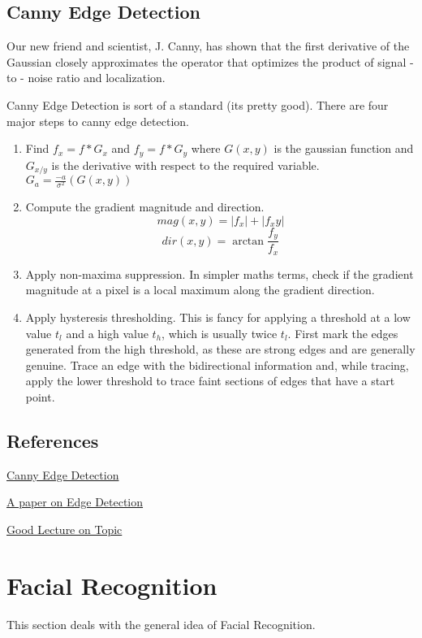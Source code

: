 \subsection{Canny Edge Detection}
Our new friend and scientist, J. Canny, has shown that the first derivative of the Gaussian closely approximates the operator that optimizes the product of signal - to - noise ratio and localization.

Canny Edge Detection is sort of a standard (its pretty good). There are four major steps to canny edge detection.
\begin{enumerate}
	\item Find $f_x = f * G_x$ and $f_y = f * G_y$ where $G(x,y)$ is the gaussian function and $G_{x/y}$ is the derivative with respect to the required variable. $G_a = \frac{-a}{\sigma^2}(G(x,y))$
	\item Compute the gradient magnitude and direction.\[ mag(x,y) = \left| f_x \right| + \left| f_xy \right| \] \[dir(x,y) = \arctan{\frac{f_y}{f_x}}\]
	\item Apply non-maxima suppression. In simpler maths terms, check if the gradient magnitude at a pixel is a local maximum along the gradient direction.
	\item Apply hysteresis thresholding. This is fancy for applying a threshold at a low value $t_l$ and a high value $t_h$, which is usually twice $t_l$. First mark the edges generated from the high threshold, as these are strong edges and are generally genuine. Trace an edge with the bidirectional information and, while tracing, apply the lower threshold to trace faint sections of edges that have a start point.
\end{enumerate}


\subsection{References}
\href{http://fourier.eng.hmc.edu/e161/lectures/canny/node1.html}{Canny Edge Detection}

\href{https://pdfs.semanticscholar.org/d5c1/d380263318c1b7a7d298500b3617e55ef2fa.pdf}{A paper on Edge Detection}

\href{http://www.me.umn.edu/courses/me5286/vision/VisionNotes/2017/ME5286-Lecture7-2017-EdgeDetection2.pdf}{Good Lecture on Topic}

\section{Facial Recognition}
This section deals with the general idea of Facial Recognition.
